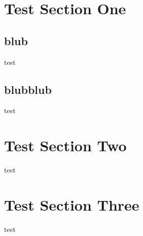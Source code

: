 \documentclass{beamer}
\begin{document}
    \frame{\tableofcontents}

\section{Test Section One}
\subsection{blub}
\begin{frame}
test
\end{frame}
\subsection{blubblub}
\begin{frame}
    test
\end{frame}
\section{Test Section Two}
\begin{frame}
test
\end{frame}
\section{Test Section Three}
\begin{frame}
test
\end{frame}
\end{document}
